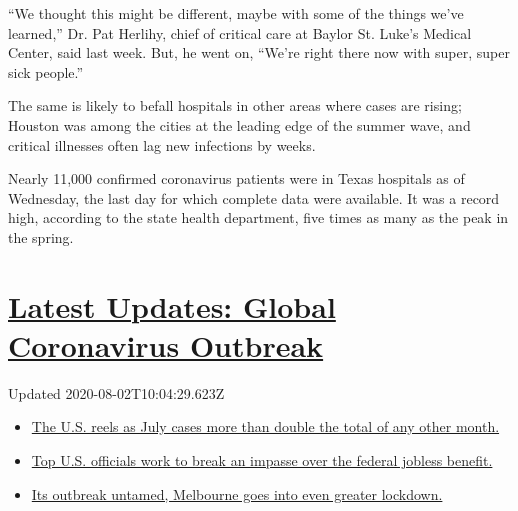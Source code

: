 ``We thought this might be different, maybe with some of the things
we've learned,'' Dr. Pat Herlihy, chief of critical care at Baylor St.
Luke's Medical Center, said last week. But, he went on, ``We're right
there now with super, super sick people.''

The same is likely to befall hospitals in other areas where cases are
rising; Houston was among the cities at the leading edge of the summer
wave, and critical illnesses often lag new infections by weeks.

Nearly 11,000 confirmed coronavirus patients were in Texas hospitals as
of Wednesday, the last day for which complete data were available. It
was a record high, according to the state health department, five times
as many as the peak in the spring.

\hypertarget{latest-updates-global-coronavirus-outbreak}{%
\section{\texorpdfstring{\href{https://www.nytimes.com/2020/08/01/world/coronavirus-covid-19.html?action=click\&pgtype=Article\&state=default\&region=MAIN_CONTENT_1\&context=storylines_live_updates}{Latest
Updates: Global Coronavirus
Outbreak}}{Latest Updates: Global Coronavirus Outbreak}}\label{latest-updates-global-coronavirus-outbreak}}

Updated 2020-08-02T10:04:29.623Z

\begin{itemize}
\tightlist
\item
  \href{https://www.nytimes.com/2020/08/01/world/coronavirus-covid-19.html?action=click\&pgtype=Article\&state=default\&region=MAIN_CONTENT_1\&context=storylines_live_updates\#link-34047410}{The
  U.S. reels as July cases more than double the total of any other
  month.}
\item
  \href{https://www.nytimes.com/2020/08/01/world/coronavirus-covid-19.html?action=click\&pgtype=Article\&state=default\&region=MAIN_CONTENT_1\&context=storylines_live_updates\#link-780ec966}{Top
  U.S. officials work to break an impasse over the federal jobless
  benefit.}
\item
  \href{https://www.nytimes.com/2020/08/01/world/coronavirus-covid-19.html?action=click\&pgtype=Article\&state=default\&region=MAIN_CONTENT_1\&context=storylines_live_updates\#link-2bc8948}{Its
  outbreak untamed, Melbourne goes into even greater lockdown.}
\end{itemize}

